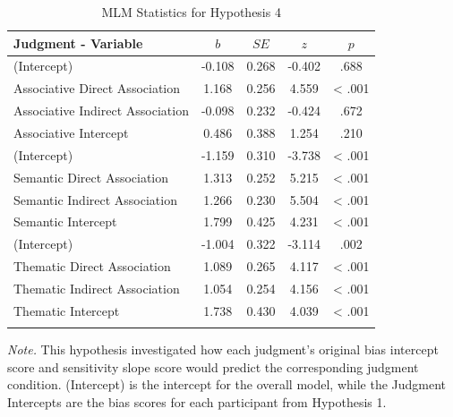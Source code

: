 \documentclass[english,,man]{apa6}
\begin{document}
\begin{table}[tbp]
\begin{center}
\begin{threeparttable}
\caption{\label{tab:hyp4-table}MLM Statistics for Hypothesis 4}
\begin{tabular}{lcccc}
\toprule
Judgment - Variable & \multicolumn{1}{c}{$b$} & \multicolumn{1}{c}{$SE$} & \multicolumn{1}{c}{$z$} & \multicolumn{1}{c}{$p$}\\
\midrule
(Intercept) & -0.108 & 0.268 & -0.402 & .688\\
Associative Direct Association & 1.168 & 0.256 & 4.559 & < .001\\
Associative Indirect Association & -0.098 & 0.232 & -0.424 & .672\\
Associative Intercept & 0.486 & 0.388 & 1.254 & .210\\
(Intercept) & -1.159 & 0.310 & -3.738 & < .001\\
Semantic Direct Association & 1.313 & 0.252 & 5.215 & < .001\\
Semantic Indirect Association & 1.266 & 0.230 & 5.504 & < .001\\
Semantic Intercept & 1.799 & 0.425 & 4.231 & < .001\\
(Intercept) & -1.004 & 0.322 & -3.114 & .002\\
Thematic Direct Association & 1.089 & 0.265 & 4.117 & < .001\\
Thematic  Indirect Association & 1.054 & 0.254 & 4.156 & < .001\\
Thematic Intercept & 1.738 & 0.430 & 4.039 & < .001\\
\bottomrule
\addlinespace
\end{tabular}
\begin{tablenotes}[para]
\normalsize{\textit{Note.} This hypothesis investigated how each judgment's original bias intercept score and sensitivity slope score would predict the corresponding judgment condition. (Intercept) is the intercept for the overall model, while the Judgment Intercepts are the bias scores for each participant from Hypothesis 1.}
\end{tablenotes}
\end{threeparttable}
\end{center}
\end{table}
\end{document}
